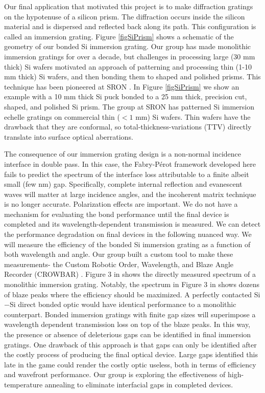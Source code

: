 \documentclass[osajnl,preprint,showpacs,superscriptaddress,12pt]{revtex4-1} %
\begin{document}
Our final application that motivated this project is to make diffraction gratings on the hypotenuse of a silicon prism.  The diffraction occurs inside the silicon material and is dispersed and reflected back along its path.  This configuration is called an immersion grating.  Figure \ref{figSiPrism} shows a schematic of the geometry of our bonded Si immersion grating.  Our group has made monolithic immersion gratings for over a decade, but challenges in processing large (30 mm thick) Si wafers motivated an approach of patterning and processing thin (1-10 mm thick) Si wafers, and then bonding them to shaped and polished prisms.  This technique has been pioneered at SRON \cite{2012SPIE.8450E..2TV}.  In Figure \ref{figSiPrism} we show an example with a 10 mm thick Si puck bonded to a 25 mm thick, precision cut, shaped, and polished Si prism.  The group at SRON has patterned Si immersion echelle gratings on commercial thin  ($< 1$ mm) Si wafers.  Thin wafers have the drawback that they are conformal, so total-thickness-variations (TTV) directly translate into surface optical aberrations\cite{2012SPIE.8450E..2TV}.  

The consequence of our immersion grating design is a non-normal incidence interface in double pass.  In this case, the Fabry-P\'{e}rot framework developed here fails to predict the spectrum of the interface loss attributable to a finite albeit small (few nm) gap.  Specifically, complete internal reflection and evanescent waves will matter at large incidence angles, and the incoherent matrix technique is no longer accurate.  Polarization effects are important.  We do not have a mechanism for evaluating the bond performance until the final device is completed and its wavelength-dependent transmission is measured.  We can detect the performance degradation on final devices in the following nuanced way.  We will measure the efficiency of the bonded Si immersion grating as a function of both wavelength and angle.  Our group built a custom tool to make these measurements- the Custom Robotic Order, Wavelength, and Blaze Angle Recorder (CROWBAR) \cite{2012SPIE.8450E..2SG}.  Figure 3 in \cite{2012SPIE.8450E..2SG} shows the directly measured spectrum of a monolithic immersion grating.  Notably, the spectrum in Figure 3 in \cite{2012SPIE.8450E..2SG}  shows dozens of blaze peaks where the efficiency should be maximized.  A perfectly contacted Si$-$Si direct bonded optic would have identical performance to a monolithic counterpart.  Bonded immersion gratings with finite gap sizes will superimpose a wavelength dependent transmission loss on top of the blaze peaks.  In this way, the presence or absence of deleterious gaps can be identified in final immersion gratings.  One drawback of this approach is that gaps can only be identified after the costly process of producing the final optical device.  Large gaps identified this late in the game could render the costly optic useless, both in terms of efficiency and wavefront performance.  Our group is exploring the effectiveness of high-temperature annealing to eliminate interfacial gaps in completed devices.
\end{document}
